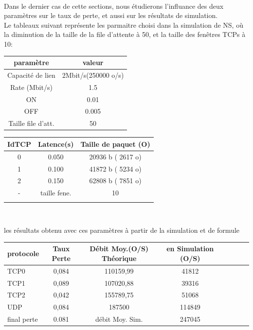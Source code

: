 \documentclass[a4paper]{report}
\theoremstyle{definition}
\begin{document}
\paragraph*{}
   Dans le dernier cas de cette sections, nous étudierons l'influance des deux paramètres sur le taux de perte, et aussi sur les résultats de simulation. \\
   Le tableaux suivant représente les parmaitre choisi dans la simulation de NS, où la diminution de la taille de la file d'attente à 50, et la taille des fenêtres TCPs à 10:\\    
   \begin{center}
   

\begin{tabular}{|c|c|}
\hline
 paramètre  & valeur \\ \hline
 
 Capacité de lien & 2Mbit/s(250000 o/s) \\ 
 Rate (Mbit/s) & 1.5 \\ 
 ON & 0.01\\ 
 OFF & 0.005 \\ 
 Taille file d'att. & 50\\
 
\hline
\end{tabular}
\begin{tabular}{|c|c|c|}
\hline
 IdTCP  & Latence(s) & Taille de paquet (O) \\ \hline
 
 0 & 0.050 & 20936 b ( 2617 o)	 \\ 
 1 & 0.100 & 41872 b ( 5234 o)	 \\ 
 2 & 0.150 & 62808 b ( 7851 o)	 \\ 
 - & taille fene. & 10\\ 
 &&\\
 
\hline
\end{tabular}\\
   \end{center}
les résultats obtenu avec ces paramètres à partir de la simulation et de formule    \\
\begin{center}


\begin{tabular}{|l|c|c|c|c|c|c|c|}
\hline
 protocole & Taux Perte & Débit Moy.(O/S) Théorique & en Simulation (O/S) \\ \hline
 TCP0 & 0,084 &  110159,99 &  41812     \\
 TCP1 & 0,089 &  107020,88 &  39316     \\ 
 TCP2 & 0,042 &  155789,75 &  51068     \\ 
 UDP  & 0,084 &  187500    &  114849    \\ 
 \hline
 final perte & 0.081  & débit Moy. Sim. & 247045   \\ 
\hline
\end{tabular}
\end{center}
\end{document}
